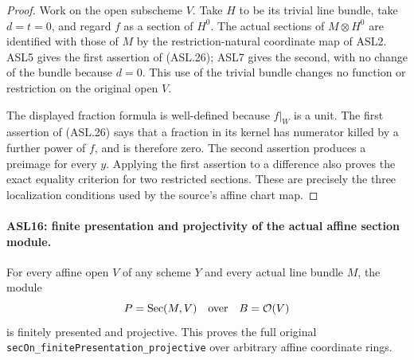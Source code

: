 \begin{proof}
Work on the open subscheme $V$.  Take $H$ to be its trivial
line bundle, take $d=t=0$, and regard $f$ as a section of
$H^0$.  The actual sections of $M\otimes H^0$ are identified
with those of $M$ by the restriction-natural coordinate map
of ASL2.  ASL5 gives the first assertion of (ASL.26); ASL7
gives the second, with no change of the bundle because $d=0$.
This use of the trivial bundle changes no function or restriction
on the original open $V$.

The displayed fraction formula is well-defined because $f|_W$
is a unit.  The first assertion of (ASL.26) says that a fraction
in its kernel has numerator killed by a further power of $f$,
and is therefore zero.  The second assertion produces a
preimage for every $y$.  Applying the first assertion to a
difference also proves the exact equality criterion for two
restricted sections.  These are precisely the three localization
conditions used by the source's affine chart map.
\end{proof}

\paragraph{ASL16: finite presentation and projectivity of the actual affine section module.}
\label{claim:ASL16}
For every affine open $V$ of any scheme $Y$ and every actual
line bundle $M$, the module
\[
                    P=\operatorname{Sec}(M,V)
              \quad\hbox{over}\quad B=\mathcal O(V)
\]
is finitely presented and projective.  This proves the full
original \texttt{sec\allowbreak{}On\_\allowbreak{}finite\allowbreak{}Presentation\_\allowbreak{}projective} over
arbitrary affine coordinate rings.

